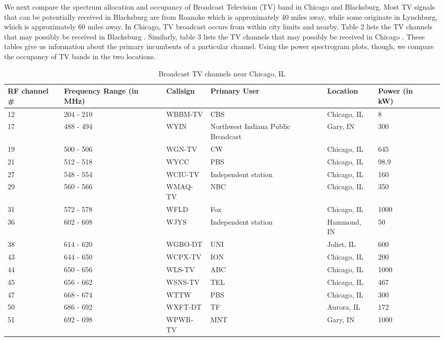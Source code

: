 \documentclass[12pt,sts]{report}
\begin{document}
	We next compare the spectrum allocation and occupancy of Broadcast Television (TV) band in Chicago and Blacksburg. Most TV signals that can be potentially received in Blacksburg are from Roanoke which is approximately 40 miles away, while some originate in Lynchburg, which is approximately 60 miles away. In Chicago, TV broadcast occurs from within city limits and nearby. Table 2 lists the TV channels that may possibly be received in Blacksburg \cite{tv_channel_info_blacksburg} \cite{tv_channel_frequencies}. Similarly, table 3 lists the TV channels that may possibly be received in Chicago \cite{tv_channel_info_chicago} \cite{tv_channel_frequencies}. These tables give us information about the primary incumbents of a particular channel. Using the power spectrogram plots, though, we compare the occupancy of TV bands in the two locations.
	
	\begin{table}[ht!]
		\begin{tabular}{| p{2cm} | p{2cm} | p{3cm} | p{2cm} | p{2cm} | p{2cm} | p{2cm} |}
		\hline
		RF channel \#	& Frequency Range (in MHz)	& Callsign 	& Primary User 	& Location 	& Power (in kW) \\	\hline
		
		12 & 204 - 210 & WBBM-TV & CBS & Chicago, IL & 8 \\	\hline
		17 & 488 - 494 & WYIN & Northwest Indiana Public Broadcast & Gary, IN & 300 \\ \hline
		19 & 500 - 506 & WGN-TV & CW & Chicago, IL & 645 \\	\hline
		21 & 512 - 518 & WYCC & PBS & Chicago, IL & 98.9	\\	\hline
		27 & 548 - 554 & WCIU-TV & Independent station & Chicago, IL & 160 \\	\hline
		29 & 560 - 566 & WMAQ-TV & NBC & Chicago, IL & 350 \\	\hline
		31 & 572 - 578 & WFLD & Fox & Chicago, IL & 1000	\\	\hline
		36 & 602 - 608 & WJYS & Independent station & Hammond, IN & 50	\\	\hline
		38 & 614 - 620 & WGBO-DT & UNI & Joliet, IL & 600	\\	\hline
		43 & 644 - 650 & WCPX-TV & ION & Chicago, IL & 200 \\	\hline
		44 & 650 - 656 & WLS-TV & ABC & Chicago, IL & 1000	\\	\hline
		45 & 656 - 662 & WSNS-TV & TEL & Chicago, IL & 467 \\	\hline
		47 & 668 - 674 & WTTW & PBS & Chicago, IL & 300 \\	\hline
		50 & 686 - 692 & WXFT-DT & TF & Aurora, IL & 172	\\	\hline
		51 & 692 - 698 & WPWR-TV & MNT & Gary, IN & 1000	\\
		\hline
		\end{tabular}
		\caption{Broadcast TV channels near Chicago, IL}
	\end{table}
	
\end{document}
